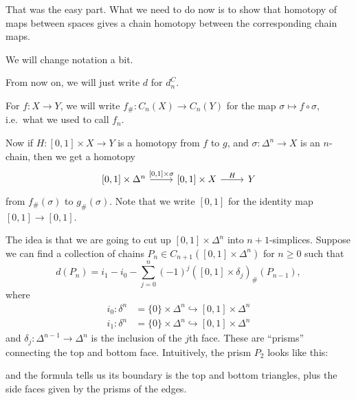 \documentclass[a4paper]{article}
\theoremstyle{definition}
\begin{document}
That was the easy part. What we need to do now is to show that homotopy of maps between spaces gives a chain homotopy between the corresponding chain maps.

We will change notation a bit.
\begin{notation}
  From now on, we will just write $d$ for $d_n^C$.

  For $f: X \to Y$, we will write $f_\#: C_n(X) \to C_n(Y)$ for the map $\sigma \mapsto f \circ \sigma$, i.e.\ what we used to call $f_n$.
\end{notation}

Now if $H: [0, 1] \times X \to Y$ is a homotopy from $f$ to $g$, and $\sigma: \Delta^n \to X$ is an $n$-chain, then we get a homotopy
\[
  \begin{tikzcd}
    \lbrack0, 1\rbrack \times \Delta^n \ar[r, "{[0, 1] \times \sigma}"] & \lbrack0, 1\rbrack \times X \ar[r, "H"] & Y
  \end{tikzcd}
\]
from $f_\#(\sigma)$ to $g_\#(\sigma)$. Note that we write $[0, 1]$ for the identity map $[0, 1] \to [0, 1]$.

The idea is that we are going to cut up $[0, 1] \times \Delta^n$ into $n + 1$-simplices. Suppose we can find a collection of chains $P_n \in C_{n + 1}([0, 1] \times \Delta^n)$ for $n \geq 0$ such that
\[
  d(P_n) = i_1 - i_0 - \sum_{j = 0}^n (-1)^j ([0, 1] \times \delta_j)_\#(P_{n - 1}),
\]
where
\begin{align*}
  i_0: \delta^n &= \{0\} \times \Delta^n \hookrightarrow [0, 1] \times \Delta^n\\
  i_1: \delta^n &= \{0\} \times \Delta^n \hookrightarrow [0, 1] \times \Delta^n
\end{align*}
and $\delta_j: \Delta^{n - 1} \to \Delta^n$ is the inclusion of the $j$th face. These are ``prisms'' connecting the top and bottom face. Intuitively, the prism $P_2$ looks like this:
\begin{center}
\end{center}
and the formula tells us its boundary is the top and bottom triangles, plus the side faces given by the prisms of the edges.
\end{document}

